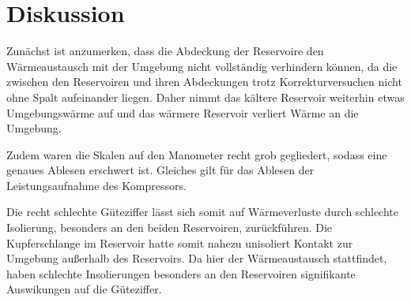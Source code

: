 \section{Diskussion}
\label{sec:Diskussion}

Zunächst ist anzumerken, dass die Abdeckung der Reservoire den Wärmeaustausch mit der Umgebung nicht vollständig verhindern können, da die zwischen den Reservoiren und ihren Abdeckungen trotz Korrekturversuchen nicht ohne Spalt aufeinander liegen.
Daher nimmt das kältere Reservoir weiterhin etwas Umgebungswärme auf und das wärmere Reservoir verliert Wärme an die Umgebung.

Zudem waren die Skalen auf den Manometer recht grob gegliedert, sodass eine genaues Ablesen erschwert ist. Gleiches gilt für das Ablesen der Leistungsaufnahme des Kompressors.

Die recht schlechte Güteziffer lässt sich somit auf Wärmeverluste durch schlechte Isolierung, besonders an den beiden Reservoiren, zurückführen.
Die Kupferschlange im Reservoir hatte somit nahezu unisoliert Kontakt zur Umgebung außerhalb des Reservoirs. Da hier der Wärmeaustausch stattfindet, haben schlechte Insolierungen besonders an den Reservoiren signifikante Auswikungen auf die Güteziffer.
